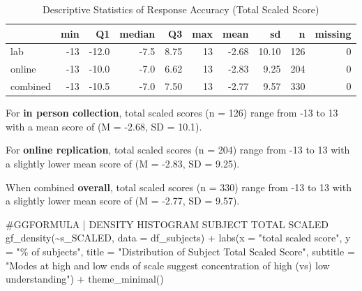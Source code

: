 \documentclass[
  letterpaper,
  DIV=11,
  numbers=noendperiod]{scrreprt}
\newenvironment{Shaded}{\begin{snugshade}}{\end{snugshade}}
\newcommand{\AttributeTok}[1]{\textcolor[rgb]{0.40,0.45,0.13}{#1}}
\newcommand{\CommentTok}[1]{\textcolor[rgb]{0.37,0.37,0.37}{#1}}
\newcommand{\FunctionTok}[1]{\textcolor[rgb]{0.28,0.35,0.67}{#1}}
\newcommand{\NormalTok}[1]{\textcolor[rgb]{0.00,0.23,0.31}{#1}}
\newcommand{\SpecialCharTok}[1]{\textcolor[rgb]{0.37,0.37,0.37}{#1}}
\newcommand{\StringTok}[1]{\textcolor[rgb]{0.13,0.47,0.30}{#1}}
\begin{document}
\begin{table}

\caption{Descriptive Statistics of Response Accuracy (Total Scaled Score)}
\centering
\begin{tabular}[t]{l|r|r|r|r|r|r|r|r|r}
\hline
  & min & Q1 & median & Q3 & max & mean & sd & n & missing\\
\hline
lab & -13 & -12.0 & -7.5 & 8.75 & 13 & -2.68 & 10.10 & 126 & 0\\
\hline
online & -13 & -10.0 & -7.0 & 6.62 & 13 & -2.83 & 9.25 & 204 & 0\\
\hline
combined & -13 & -10.5 & -7.0 & 7.50 & 13 & -2.77 & 9.57 & 330 & 0\\
\hline
\end{tabular}
\end{table}

For \textbf{in person collection}, total scaled scores (n = 126) range
from -13 to 13 with a mean score of (M = -2.68, SD = 10.1).

For \textbf{online replication}, total scaled scores (n = 204) range
from -13 to 13 with a slightly lower mean score of (M = -2.83, SD =
9.25).

When combined \textbf{overall}, total scaled scores (n = 330) range from
-13 to 13 with a slightly lower mean score of (M = -2.77, SD = 9.57).

\begin{Shaded}
\begin{Highlighting}[]
\CommentTok{\#GGFORMULA | DENSITY HISTOGRAM SUBJECT TOTAL SCALED}
\FunctionTok{gf\_density}\NormalTok{(}\SpecialCharTok{\textasciitilde{}}\NormalTok{s\_SCALED, }\AttributeTok{data =}\NormalTok{ df\_subjects) }\SpecialCharTok{+}
  \FunctionTok{labs}\NormalTok{(}\AttributeTok{x =} \StringTok{"total scaled score"}\NormalTok{,}
       \AttributeTok{y =} \StringTok{"\% of subjects"}\NormalTok{,}
       \AttributeTok{title =} \StringTok{"Distribution of Subject Total Scaled Score"}\NormalTok{,}
       \AttributeTok{subtitle =} \StringTok{"Modes at high and low ends of scale suggest concentration of high (vs) low understanding"}\NormalTok{) }\SpecialCharTok{+} 
  \FunctionTok{theme\_minimal}\NormalTok{()}
\end{Highlighting}
\end{Shaded}
\end{document}
